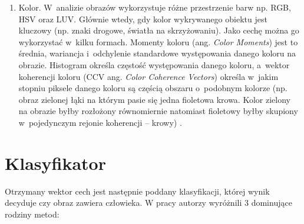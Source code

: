 \begin{enumerate}
\item Kolor. 
W~analizie obrazów wykorzystuje różne przestrzenie barw np. RGB, HSV oraz LUV. 
Głównie wtedy, gdy kolor wykrywanego obiektu jest kluczowy (np. znaki drogowe, światła na skrzyżowaniu). 
Jako cechę można go wykorzystać w~kilku formach. 
Momenty koloru (ang. \textit{Color Moments}) jest to średnia, wariancja i~odchylenie standardowe występowania danego koloru na obrazie. 
Histogram określa częstość występowania danego koloru, a~wektor koherencji koloru (CCV ang. \textit{Color Coherence Vectors}) określa w~jakim stopniu piksele danego koloru są częścią obszaru o~podobnym kolorze (np. obraz zielonej łąki na którym pasie się jedna fioletowa krowa. Kolor zielony na obrazie byłby rozłożony równomiernie natomiast fioletowy byłby skupiony w~pojedynczym rejonie koherencji -- krowy) \cite{kodituwakku2004comparison}.

\end{enumerate}

\section{Klasyfikator}

Otrzymany wektor cech jest następnie poddany klasyfikacji, której wynik decyduje czy obraz zawiera człowieka.
W pracy \cite{benenson2014ten} autorzy wyróżnili 3 dominujące rodziny metod:

